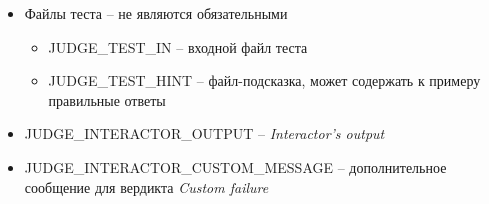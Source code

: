 \begin{itemize}
    \item Файлы теста -- не являются обязательными
        \begin{itemize}
            \item JUDGE\_TEST\_IN -- входной файл теста
            \item JUDGE\_TEST\_HINT -- файл-подсказка, может содержать к примеру правильные ответы
        \end{itemize}
    \item JUDGE\_INTERACTOR\_OUTPUT -- \textit{Interactor's output}
    \item JUDGE\_INTERACTOR\_CUSTOM\_MESSAGE -- дополнительное сообщение для вердикта \textit{Custom failure}
\end{itemize}


